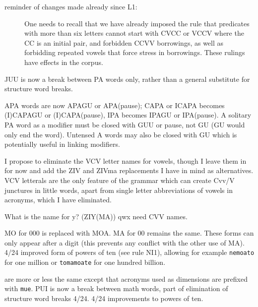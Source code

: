 \documentclass[12pt]{article}
\begin{document}
\begin{description}
\begin{description}
\item[reminder of changes made already since L1:]  One needs to recall that we have already imposed the rule
that predicates with more than six letters cannot start with CVCC or VCCV where the CC is an initial pair, and forbidden
CCVV borrowings, as well as forbidding repeated vowels that force stress in borrowings.  These rulings have effects
in the corpus.

\end{description}

\item[Subproposals in the lexing section:]

\begin{description}

\item

\item[JUU separates adjacent PA words:]   JUU is now a break between PA words only, rather than a general substitute for structure word breaks.

\item  [Close APA words and kin:]   APA words are now APAGU or APA(pause); CAPA or ICAPA becomes (I)CAPAGU or (I)CAPA(pause),  IPA becomes IPAGU or IPA(pause).   A solitary PA word
as a modifier must be closed with GUU or pause, not GU (GU would only end the word).   Untensed A words may also be closed with GU which is potentially useful in linking modifiers.

\item  [No VCV letterals?:]  I propose to eliminate the VCV letter names for vowels, though I leave them in for now and add the ZIV and ZIVma replacements
I have in mind as alternatives.   VCV letterals are the only feature of the grammar which can create Cvv/V junctures in little words, 
apart from single letter abbreviations of vowels in acronyms, which I have eliminated.

What is the name for y?  (ZIY(MA))  qwx need CVV names.

\item[multizero forms:]  MO for 000 is replaced with MOA.  MA for 00 remains the same.  These forms can only appear after a digit (this
prevents any conflict with the other use of MA).  4/24 improved form of powers of ten (see rule NI1), allowing for example
{\tt nemoato} for one million or {\tt tomamoate} for one hundred billion.

\item[math forms:]  are more or less the same except that acronyms used as dimensions are prefixed with {\tt mue}.   PUI is now a break
between math words, part of elimination of structure word breaks 4/24.  4/24 improvements to powers of ten.


\end{description}
\end{description}
\end{document}

